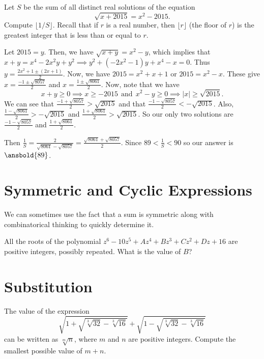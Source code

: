 \documentclass{article}
\begin{document}
\begin{exam}{6}
Let $S$ be the sum of all distinct real solutions of the equation 
\[\sqrt{x + 2015} = x^2 - 2015.\]
Compute $\lfloor 1/S \rfloor$.  Recall that if $r$ is a real number, then $\lfloor r \rfloor$ (the floor of $r$) is the greatest integer that is less than or equal to $r$.
\end{exam}

\begin{sol}
Let $2015=y$. Then, we have $\sqrt{x+y}=x^2-y$, which implies that $x+y=x^4-2x^2y+y^2\implies y^2+(-2x^2-1)y+x^4-x=0$. Thus $y=\frac{2x^2+1 \pm (2x+1)}{2}$. Now, we have $2015=x^2+x+1$ or $2015=x^2-x$. These give $x=\frac{-1 \pm \sqrt{8057}}{2}$ and $x=\frac{1 \pm \sqrt{8061}}{2}$. Now, note that we have
\[x+y\ge 0 \implies x \ge -2015~~\text{and}~~x^2-y\ge 0\implies |x|\ge \sqrt{2015}.\]
We can see that $\frac{-1 + \sqrt{8057}}{2}>\sqrt{2015}$ and that $\frac{-1-\sqrt{8057}}{2} < -\sqrt{2015}$. Also, $\frac{1-\sqrt{8061}}{2} > - \sqrt{2015}$ and $\frac{1+\sqrt{8061}}{2} > \sqrt{2015}$. So our only two solutions are $\frac{-1-\sqrt{8057}}{2}$ and $\frac{1+\sqrt{8061}}{2}$.

Then $\frac{1}{S}=\frac{2}{\sqrt{8061}-\sqrt{8057}}=\frac{\sqrt{8061}+\sqrt{8057}}{2}$. Since $89 < \frac{1}{S} < 90$ so our answer is $\ansbold{89}$.
\end{sol}

\section{Symmetric and Cyclic Expressions}
We can sometimes use the fact that a sum is symmetric along with combinatorical thinking to quickly determine it.

\begin{exam}[AMC 10A 2021/14]
All the roots of the polynomial $z^6-10z^5+Az^4+Bz^3+Cz^2+Dz+16$ are positive integers, possibly repeated. What is the value of $B$?
\end{exam}

\section{Substitution}

\begin{exam}[NEMO 2017]
The value of the expression
\[\sqrt{1+\sqrt{\sqrt[3]{32}-\sqrt[3]{16}}} + \sqrt{1-\sqrt{\sqrt[3]{32}-\sqrt[3]{16}}}\]
can be written as $\sqrt[m]{n}$, where $m$ and $n$ are positive integers. Compute the smallest possible value of
$m + n$.
\end{exam}
\end{document}
